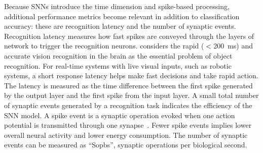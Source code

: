 Because SNNs introduce the time dimension and spike-based processing, additional performance metrics become relevant in addition to classification accuracy: these are recognition latency and the number of synaptic events.
Recognition latency measures how fast spikes are conveyed through the layers of network to trigger the recognition neurons.
\cite{dicarlo2012does} considers the rapid ($<$200~ms) and accurate vision recognition in the brain as the essential problem of object recognition.
For real-time systems with live visual inputs, such as robotic systems, a short response latency helps make fast decisions and take rapid action.
The latency is measured as the time difference between the first spike generated by the output layer and the first spike from the input layer.
A small total number of synaptic events generated by a recognition task indicates the efficiency of the SNN model.
A spike event is a synaptic operation evoked when one action potential is transmitted through one synapse~\cite{sharp2012power}.
Fewer spike events implies lower overall neural activity and lower energy consumption.
The number of synaptic events can be measured as ``Sopbs'', synaptic operations per biological second.
